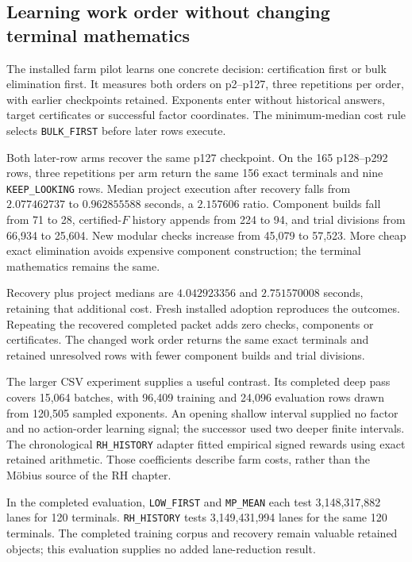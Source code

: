 \subsection{Learning work order without changing terminal mathematics}

The installed farm pilot learns one concrete decision:
certification first or bulk elimination first. It measures both
orders on p2--p127, three repetitions per order, with earlier
checkpoints retained. Exponents enter without historical
answers, target certificates or successful factor coordinates.
The minimum-median cost rule selects
\texttt{BULK\_FIRST} before later rows execute.

Both later-row arms recover the same p127 checkpoint. On the
165 p128--p292 rows, three repetitions per arm return the same
156 exact terminals and nine \texttt{KEEP\_LOOKING} rows.
Median project execution after recovery falls from
\(2.077462737\) to \(0.962855588\) seconds, a \(2.157606\)
ratio. Component builds fall from 71 to 28, certified-\(F\)
history appends from 224 to 94, and trial divisions from
66,934 to 25,604. New modular checks increase from 45,079
to 57,523. More cheap exact elimination avoids expensive
component construction; the terminal mathematics remains
the same.

Recovery plus project medians are \(4.042923356\) and
\(2.751570008\) seconds, retaining that additional cost.
Fresh installed adoption reproduces the outcomes. Repeating
the recovered completed packet adds zero checks, components
or certificates. The changed work order returns the same exact terminals and retained unresolved rows with fewer component builds and trial divisions.

The larger CSV experiment supplies a useful contrast. Its
completed deep pass covers 15,064 batches, with 96,409
training and 24,096 evaluation rows drawn from 120,505
sampled exponents. An opening shallow interval supplied no
factor and no action-order learning signal; the successor
used two deeper finite intervals. The chronological
\texttt{RH\_HISTORY} adapter fitted empirical signed rewards
using exact retained arithmetic. Those coefficients describe
farm costs, rather than the Möbius source of the RH chapter.

In the completed evaluation, \texttt{LOW\_FIRST} and
\texttt{MP\_MEAN} each test 3,148,317,882 lanes for 120
terminals. \texttt{RH\_HISTORY} tests 3,149,431,994 lanes
for the same 120 terminals. The completed training corpus
and recovery remain valuable retained objects; this
evaluation supplies no added lane-reduction result.

